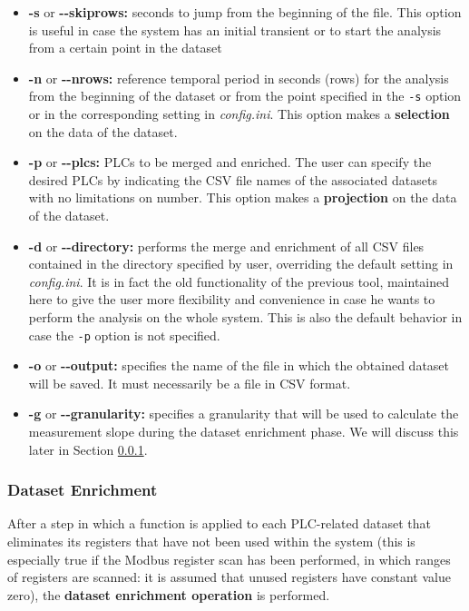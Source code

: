\begin{itemize}
	\item \textbf{-s} or \textbf{{-}{-}skiprows:} seconds to jump from the beginning of the file. This option is useful in case the system has an initial transient or to start the analysis from a certain point in the dataset
	
	\item \textbf{-n} or \textbf{{-}{-}nrows:} reference temporal period in seconds (rows) for the analysis from the beginning of the dataset or from the point specified in the \texttt{-s} option or in the corresponding setting in \textit{config.ini}.\newline
	This option makes a \textbf{selection} on the data of the dataset.
	
	\item \textbf{-p} or \textbf{{-}{-}plcs:} PLCs to be merged and enriched. The user can specify the desired PLCs by indicating the CSV file names of the associated datasets with no limitations on number.\newline
	This option makes a \textbf{projection} on the data of the dataset.
	
	\item \textbf{-d} or \textbf{{-}{-}directory:} performs the merge and enrichment of all CSV files contained in the directory specified by user, overriding the default setting in \textit{config.ini}. It is in fact the old functionality of the previous tool, maintained here to give the user more flexibility and convenience in case he wants to perform the analysis on the whole system. This is also the default behavior in case the \texttt{-p} option is not specified.
	
	\item \textbf{-o} or \textbf{{-}{-}output:} specifies the name of the file in which the obtained dataset will be saved. It must necessarily be a file in CSV format.
	
	\item \textbf{-g} or \textbf{{-}{-}granularity:} specifies a granularity that will be used to calculate the measurement slope during the dataset enrichment phase. We will discuss this later in Section \ref{subsubsec:4_dataset_enrichment}.
\end{itemize}

\subsubsection{Dataset Enrichment}
\label{subsubsec:4_dataset_enrichment}
After a step in which a function is applied to each PLC-related dataset that eliminates its registers that have not been used within the system (this is especially true if the Modbus register scan has been performed, in which ranges of registers are scanned: it is assumed that unused registers have constant value zero), the \textbf{dataset enrichment operation} is performed.

